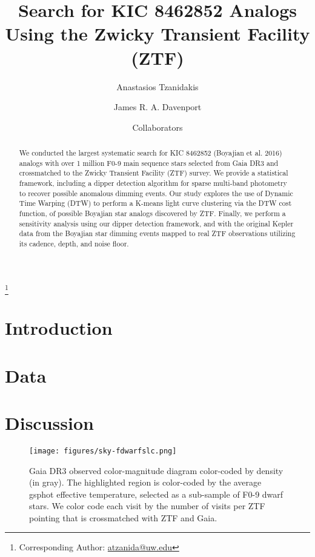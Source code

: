 \documentclass[linenumbers]{aastex631}
\begin{document}
\title{Search for KIC 8462852 Analogs Using the Zwicky Transient Facility (ZTF)}

\author[0000-0003-0484-3331]{Anastasios Tzanidakis}\thanks{Corresponding Author: \href{mailto:atzanida@uw.edu}{atzanida@uw.edu}}

\author[0000-0002-0637-835X]{James R. A. Davenport}

\author{Collaborators}

\begin{abstract}
We conducted the largest systematic search for KIC 8462852 (Boyajian et al. 2016) analogs with over 1 million F0-9 main sequence stars selected from Gaia DR3 and crossmatched to the Zwicky Transient Facility (ZTF) survey. We provide a statistical framework, including a dipper detection algorithm for sparse multi-band photometry to recover possible anomalous dimming events. Our study explores the use of Dynamic Time Warping (DTW) to perform a K-means light curve clustering via the DTW cost function, of possible Boyajian star analogs discovered by ZTF. Finally, we perform a sensitivity analysis using our dipper detection framework, and with the original Kepler data from the Boyajian star dimming events mapped to real ZTF observations utilizing its cadence, depth, and noise floor.
\end{abstract}




\section{Introduction} \label{sec:intro}

\section{Data} \label{sec:data}


\section{Discussion} \label{sec:discussion}

\begin{figure*}
\centering
  \texttt{[image: figures/sky-fdwarfslc.png]}
  \caption{Gaia DR3 observed color-magnitude diagram color-coded by density (in gray). The highlighted region is color-coded by the average gsphot effective temperature, selected as a sub-sample of F0-9 dwarf stars. We color code each visit by the number of visits per ZTF pointing that is crossmatched with ZTF and Gaia. }
  \label{fig:gaiasample}
\end{figure*}
\end{document}
